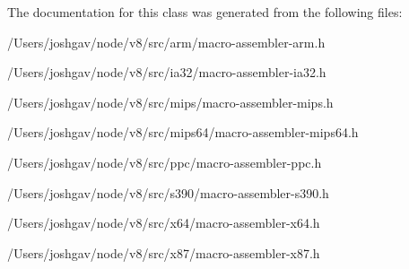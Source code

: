 The documentation for this class was generated from the following files\+:\begin{DoxyCompactItemize}
\item 
/\+Users/joshgav/node/v8/src/arm/macro-\/assembler-\/arm.\+h\item 
/\+Users/joshgav/node/v8/src/ia32/macro-\/assembler-\/ia32.\+h\item 
/\+Users/joshgav/node/v8/src/mips/macro-\/assembler-\/mips.\+h\item 
/\+Users/joshgav/node/v8/src/mips64/macro-\/assembler-\/mips64.\+h\item 
/\+Users/joshgav/node/v8/src/ppc/macro-\/assembler-\/ppc.\+h\item 
/\+Users/joshgav/node/v8/src/s390/macro-\/assembler-\/s390.\+h\item 
/\+Users/joshgav/node/v8/src/x64/macro-\/assembler-\/x64.\+h\item 
/\+Users/joshgav/node/v8/src/x87/macro-\/assembler-\/x87.\+h\end{DoxyCompactItemize}
